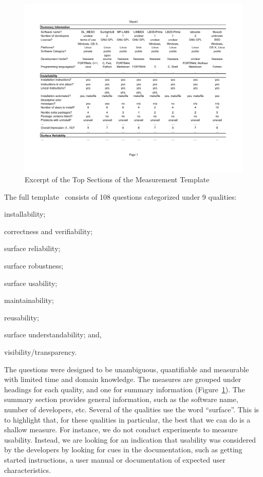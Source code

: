 \documentclass[runningheads]{llncs}
\begin{document}
\begin{figure}[!ht]
	\begin{center}
	  \includegraphics[width=1.0\textwidth]{./figures/measurement_template.pdf}
	  \caption{Excerpt of the Top Sections of the Measurement Template}
	  \label{measurement_template_image}
	\end{center}
\end{figure}

The full template~\cite{SmithEtAl2021} consists of 108 questions categorized
under 9 qualities:
\begin{inparaenum}[(i)]
	\item installability;
	\item correctness and verifiability;
	\item surface reliability;
	\item surface robustness;
	\item surface usability;
	\item maintainability;
	\item reusability;
	\item surface understandability; and,
	\item visibility/transparency. 
\end{inparaenum} 

The questions were designed to be unambiguous, quantifiable and measurable with
limited time and domain knowledge. The measures are grouped under headings for
each quality, and one for summary information
(Figure~\ref{measurement_template_image}).   The summary section provides
general information, such as the software name, number of developers, etc.
Several of the qualities use the word ``surface''.  This is to highlight that,
for these qualities in particular, the best that we can do is a shallow measure.
For instance, we do not conduct experiments to measure usability. Instead, we
are looking for an indication that usability was considered by the developers by
looking for cues in the documentation, such as getting started instructions, a
user manual or documentation of expected user characteristics.
\end{document}

